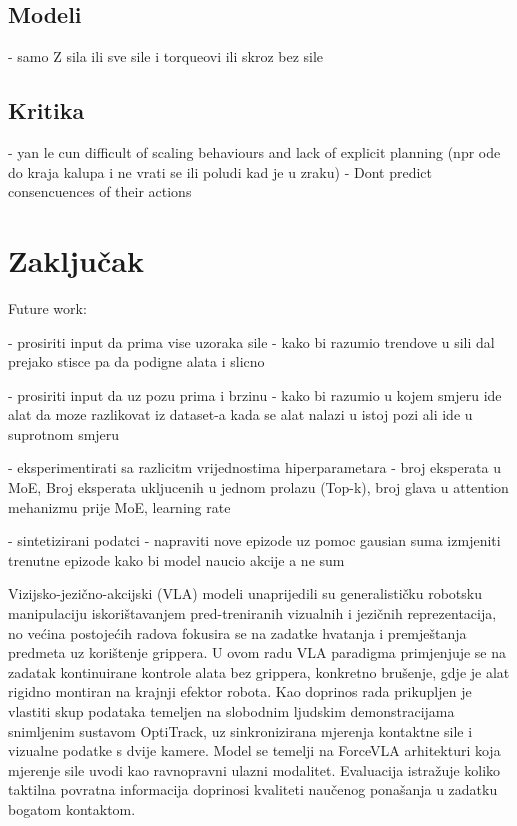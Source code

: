 \documentclass[times, utf8, diplomski]{fer}
\begin{document}
\section{Modeli}
- samo Z sila ili sve sile i torqueovi ili skroz bez sile 

\section{Kritika}
- yan le cun difficult of scaling behaviours and lack of explicit planning (npr ode do kraja kalupa i ne vrati se ili poludi kad je u zraku)
- Dont predict consencuences of their actions

\chapter{Zaključak}
Future work:

- prosiriti input da prima vise uzoraka sile - kako bi razumio trendove u sili dal prejako stisce pa da podigne alata i slicno

- prosiriti input da uz pozu prima i brzinu - kako bi razumio u kojem smjeru ide alat da moze razlikovat iz dataset-a kada se alat nalazi u istoj pozi ali ide u suprotnom smjeru

- eksperimentirati sa razlicitm vrijednostima hiperparametara - broj eksperata u MoE, Broj eksperata ukljucenih u jednom prolazu (Top-k), broj glava u attention mehanizmu prije MoE, learning rate

- sintetizirani podatci - napraviti nove epizode uz pomoc gausian suma izmjeniti trenutne epizode kako bi model naucio akcije a ne sum




\begin{sazetak}
Vizijsko-jezično-akcijski (VLA) modeli unaprijedili su generalističku robotsku manipulaciju iskorištavanjem pred-treniranih vizualnih i jezičnih reprezentacija, no većina postojećih radova fokusira se na zadatke hvatanja i premještanja predmeta uz korištenje grippera. U ovom radu VLA paradigma primjenjuje se na zadatak kontinuirane kontrole alata bez grippera, konkretno brušenje, gdje je alat rigidno montiran na krajnji efektor robota. Kao doprinos rada prikupljen je vlastiti skup podataka temeljen na slobodnim ljudskim demonstracijama snimljenim sustavom OptiTrack, uz sinkronizirana mjerenja kontaktne sile i vizualne podatke s dvije kamere. Model se temelji na ForceVLA arhitekturi koja mjerenje sile uvodi kao ravnopravni ulazni modalitet. Evaluacija istražuje koliko taktilna povratna informacija doprinosi kvaliteti naučenog ponašanja u zadatku bogatom kontaktom.

\end{sazetak}
\end{document}

